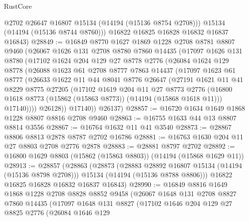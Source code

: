 \begin{lexlean}{RustCore}
\begin{coremodule}
          @2702
          @26647
          @16807
          @15134
          (@14194 (@15136 @8754 @2708)))
        @15134
        (@14194 (@15136 @8744 @8760)))
      @16822
      @16825
      @16828
      @16832
      @16837
      @16843)
@28849 := @16849
    @8770
    @1627
    @1869
    @1228
    @2708
    @8781
    @8807
    @9460
    (@26067
      @1626
      @131
      @2708
      @8780
      @7860
      @14435
      (@17097
        @1626
        @131
        @8780
        (@17102
          @1624
          @204
          @129
          @27
          @8778
          @2776
          (@26084
            @1624
            @129
            @8778
            (@26088
              @1623
              @61
              @2708
              @8777
              @7863
              @14437
              (@17097
                @1623
                @61
                @8777
                (@26633
                  @1622
                  @11
                  @44
                  @8041
                  @8776
                  @26647
                  (@27191
                    @1621
                    @11
                    @41
                    @8229
                    @8775
                    @27205
                    (@17102
                      @1619
                      @204
                      @11
                      @27
                      @8773
                      @2776
                      (@16800 @1618 @8773 (@15862 (@15863 @8773)) (@14194 (@15868 @1618 @11)))
                      @17140))))
              @26128))
          @17140))
      @26137)
@28857 := @16720 @1634 @1649 @1868 @1228 @8807 @8816 @2708 @9460
@28863 := @16755 @1633 @44 @13 @8807 @8814 @3556
@28867 := @16764 @1632 @11 @41 @3540
@28873 := @28867 @8806 @8813 @2878 @8787 @2702 @16786
@28881 := @16763 @1630 @204 @11 @27 @8803 @2708 @2776 @2878
@28883 := @28881 @8797 @2702
@28892 := @16800 @1629 @8803 (@15862 (@15863 @8803)) (@14194 (@15868 @1629 @11))
@28913 := @28857
    (@28863
      (@28873
        (@28883 @28892 @16807 @15134 (@14194 (@15136 @8798 @2708)))
        @15134
        (@14194 (@15136 @8788 @8806)))
      @16822
      @16825
      @16828
      @16832
      @16837
      @16843)
@28990 := @16849
    @8816
    @1649
    @1868
    @1228
    @2708
    @8828
    @8852
    @9458
    (@26067
      @1648
      @131
      @2708
      @8827
      @7860
      @14435
      (@17097
        @1648
        @131
        @8827
        (@17102
          @1646
          @204
          @129
          @27
          @8825
          @2776
          (@26084
            @1646
            @129

\end{coremodule}
\end{lexlean}
